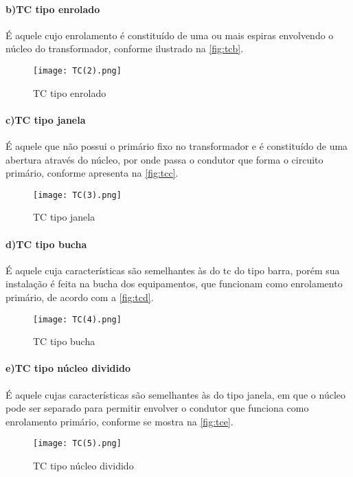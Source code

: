 				\paragraph*{b)\indent TC tipo enrolado}
					É aquele cujo enrolamento é constituído de uma ou mais espiras envolvendo o núcleo do transformador, conforme ilustrado na \autoref{fig:tcb}.
					\begin{figure}[htb]
						\caption{TC tipo enrolado}
						\centering
						\texttt{[image: TC(2).png]}
						\label{fig:tcb}
					\end{figure}
				\paragraph*{c)\indent TC tipo janela}
					É aquele que não possui o primário fixo no transformador e é constituído de uma abertura através do núcleo, por onde passa o condutor que forma o circuito primário, conforme apresenta na \autoref{fig:tcc}.
					\begin{figure}[htb]
						\caption{TC tipo janela}
						\centering
						\texttt{[image: TC(3).png]}
						\label{fig:tcc}
					\end{figure}
				\paragraph*{d)\indent TC tipo bucha}
					É aquele cuja características são semelhantes às do tc do tipo barra, porém sua instalação é feita na bucha dos equipamentos, que funcionam como enrolamento primário, de acordo com a \autoref{fig:tcd}.
					\begin{figure}[htb]
						\caption{TC tipo bucha}
						\centering
						\texttt{[image: TC(4).png]}
						\label{fig:tcd}
					\end{figure}
				\paragraph*{e)\indent TC tipo núcleo dividido}
					É aquele cujas características são semelhantes às do tipo janela, em que o núcleo pode ser separado para permitir envolver o condutor que funciona como enrolamento primário, conforme se mostra na \autoref{fig:tce}.
					\begin{figure}[htb]
						\caption{TC tipo núcleo dividido}
						\centering
						\texttt{[image: TC(5).png]}
						\label{fig:tce}
					\end{figure}
